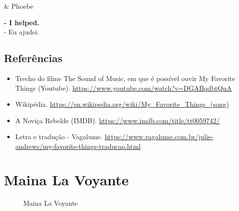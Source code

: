 \begin{tcolorbox}[enhanced,center upper,
    drop fuzzy shadow southeast, boxrule=0.3pt,
    lower separated=false,
    colframe=black!30!dialogoBorder,colback=white]
\begin{minipage}[c]{0.14\linewidth}
   & \centering \scriptsize{Phoebe}
\end{minipage}
\hspace{.1mm}
\begin{minipage}[c]{0.8\linewidth}
  \textbf{- I helped.}\\
  - Eu ajudei.
\end{minipage}
\end{tcolorbox}

\hypertarget{referuxeancias-2}{%
\subsection{Referências}\label{referuxeancias-2}}

\begin{itemize}
\tightlist
\item
  \sloppy Trecho do filme The Sound of Music, em que é possível ouvir My Favorite Things (Youtube). \url{https://www.youtube.com/watch?v=DGABqdbtQnA}
\item
  \sloppy Wikipédia. \url{https://en.wikipedia.org/wiki/My_Favorite_Things_(song)}
\item
  \sloppy A Noviça Rebelde (IMDB). \url{https://www.imdb.com/title/tt0059742/}
\item
  \sloppy Letra e tradução - Vagalume. \url{https://www.vagalume.com.br/julie-andrews/my-favorite-things-traducao.html}
\end{itemize}

\hypertarget{maina-la-voyante}{%
\section{Maina La Voyante}\label{maina-la-voyante}}

\begin{figure}
  \centering
    \caption{Maina La Voyante\label{fig:maina-la-voyante}}
\end{figure}

